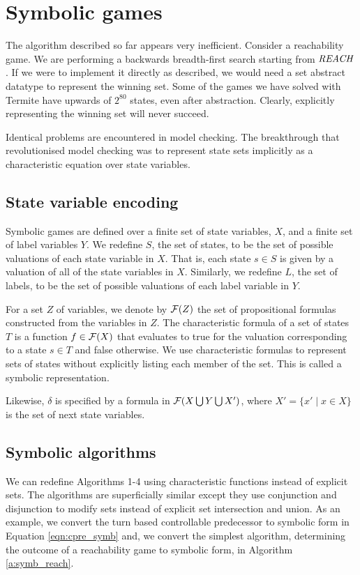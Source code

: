 \section{Symbolic games}

The algorithm described so far appears very inefficient. Consider a reachability game. We are performing a backwards breadth-first search starting from $\mathit{REACH}$. If we were to implement it directly as described, we would need a set abstract datatype to represent the winning set. Some of the games we have solved with Termite have upwards of $2^{80}$ states, even after abstraction. Clearly, explicitly representing the winning set will never succeed. 

Identical problems are encountered in model checking. The breakthrough that revolutionised model checking was to represent state sets implicitly as a characteristic equation over state variables.

\subsection{State variable encoding}

Symbolic games are defined over a finite set of state variables, $X$, and a finite set of label variables $Y$. We redefine $S$, the set of states, to be the set of possible valuations of each state variable in $X$. That is, each state $s \in S$ is given by a valuation of all of the state variables in $X$. Similarly, we redefine $L$, the set of labels, to be the set of possible valuations of each label variable in $Y$.

For a set $Z$ of variables, we denote by $\mathcal{F}(Z)$ the set of propositional formulas constructed from the variables in $Z$. The characteristic formula of a set of states $T$ is a function $f \in \mathcal{F}(X)$ that evaluates to true for the valuation corresponding to a state $s \in T$ and false otherwise. We use characteristic formulas to represent sets of states without explicitly listing each member of the set. This is called a symbolic representation.

Likewise, $\delta$ is specified by a formula in $\mathcal{F}(X \bigcup Y \bigcup X')$, where $X' = \{x' \mid x \in X \}$ is the set of next state variables.

\subsection{Symbolic algorithms}

We can redefine Algorithms 1-4 using characteristic functions instead of explicit sets. The algorithms are superficially similar except they use conjunction and disjunction to modify sets instead of explicit set intersection and union. As an example, we convert the turn based controllable predecessor to symbolic form in Equation \ref{eqn:cpre_symb} and, we convert the simplest algorithm, determining the outcome of a reachability game to symbolic form, in Algorithm \ref{a:symb_reach}.

